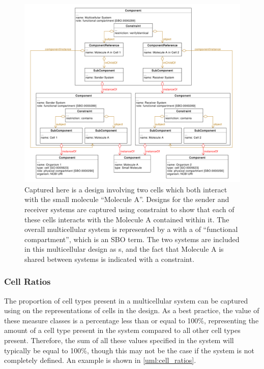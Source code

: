 \begin{figure}[htp]
	\begin{center}
		\includegraphics[width=\textwidth]{uml/two_cell_representation}
		\caption[]{Captured here is a design involving two cells which both interact with the small molecule ``Molecule A''. 
		Designs for the sender and receiver systems are captured using constraint to show that each of these cells interacts with the Molecule A contained within it.
		The overall multicellular system is represented by a  with a  of ``functional compartment'', which is an SBO term.
		The two systems are included in this multicellular design as s, and the fact that Molecule A is shared between systems is indicated with a constraint.}
		\label{uml:multiple_cell_representation}
	\end{center}
\end{figure}

\subsubsection{Cell Ratios}

The proportion of cell types present in a multicellular system can be captured using  on the representations of cells in the design.
As a best practice, the value of these measure classes is a percentage less than or equal to 100\%, representing the amount of a cell type present in the system compared to all other cell types present. 
Therefore, the sum of all these values specified in the system will typically be equal to 100\%, though this may not be the case if the system is not completely defined. 
An example is shown in \ref{uml:cell_ratios}.

